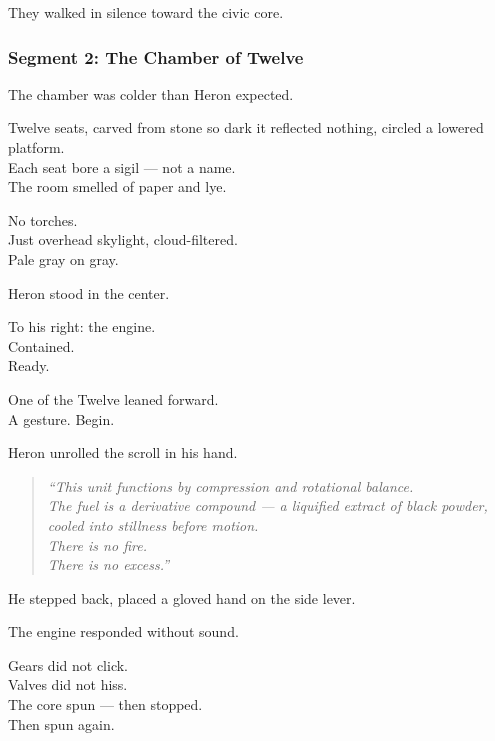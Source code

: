 \documentclass[9pt]{article}
\begin{document}
\vspace{1em}

They walked in silence toward the civic core.

\newpage

\subsubsection*{Segment 2: The Chamber of Twelve}

The chamber was colder than Heron expected.

Twelve seats, carved from stone so dark it reflected nothing, circled a lowered platform.\\
Each seat bore a sigil — not a name.\\
The room smelled of paper and lye.

No torches.\\
Just overhead skylight, cloud-filtered.\\
Pale gray on gray.

Heron stood in the center.

To his right: the engine.\\
Contained.\\
Ready.

\vspace{1em}

One of the Twelve leaned forward.\\
A gesture.  
Begin.

\vspace{1em}

Heron unrolled the scroll in his hand.

\begin{quote}
\textit{“This unit functions by compression and rotational balance.\\
The fuel is a derivative compound — a liquified extract of black powder, cooled into stillness before motion.\\
There is no fire.\\
There is no excess.”}
\end{quote}

He stepped back, placed a gloved hand on the side lever.

The engine responded without sound.

Gears did not click.\\
Valves did not hiss.\\
The core spun — then stopped.\\
Then spun again.
\end{document}
